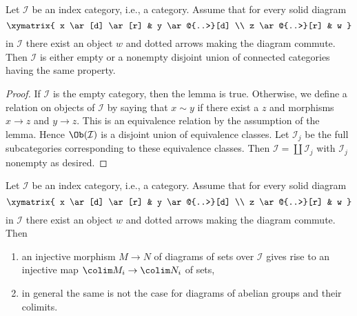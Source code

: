 \begin{lemma}
\label{lemma-split-into-connected}
Let $\mathcal{I}$ be an index category, i.e., a category. Assume
that for every solid diagram
$$
\xymatrix{
x \ar[d] \ar[r] & y \ar@{..>}[d] \\
z \ar@{..>}[r] & w
}
$$
in $\mathcal{I}$ there exist an object $w$ and dotted arrows
making the diagram commute. Then $\mathcal{I}$ is either empty
or a nonempty disjoint union of connected categories having
the same property.
\end{lemma}

\begin{proof}
If $\mathcal{I}$ is the empty category, then the lemma is true.
Otherwise, we define a relation on objects of $\mathcal{I}$ by
saying that $x \sim y$ if there exist a $z$ and
morphisms $x \to z$ and $y \to z$. This is an equivalence
relation by the assumption of the lemma. Hence $\Ob(\mathcal{I})$
is a disjoint union of equivalence classes. Let $\mathcal{I}_j$
be the full subcategories corresponding to these equivalence classes.
Then $\mathcal{I} = \coprod \mathcal{I}_j$ with $\mathcal{I}_j$
nonempty as desired.
\end{proof}

\begin{lemma}
\label{lemma-preserve-injective-maps}
Let $\mathcal{I}$ be an index category, i.e., a category. Assume
that for every solid diagram
$$
\xymatrix{
x \ar[d] \ar[r] & y \ar@{..>}[d] \\
z \ar@{..>}[r] & w
}
$$
in $\mathcal{I}$ there exist an object $w$ and dotted arrows
making the diagram commute. Then
\begin{enumerate}
\item an injective morphism $M \to N$ of diagrams of sets over
$\mathcal{I}$ gives rise to an injective map $\colim M_i \to \colim N_i$
of sets,
\item in general the same is not the case for diagrams of abelian
groups and their colimits.
\end{enumerate}
\end{lemma}

